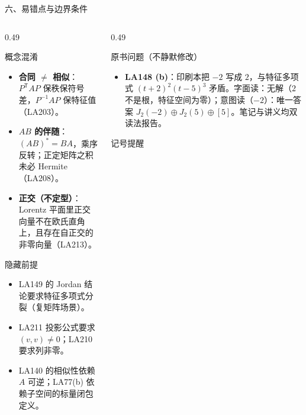 \documentclass[aspectratio=169,10pt,fontset=none]{ctexbeamer}
\begin{document}
\begin{frame}[t]{六、易错点与边界条件}
  \begin{columns}[T,onlytextwidth]
    \begin{column}{0.49\textwidth}
      \begin{alertblock}{\footnotesize 概念混淆}
        \scriptsize
        \begin{itemize}\setlength{\itemsep}{1pt}
          \item \textbf{合同 $\ne$ 相似}：$P^{\mathsf T}AP$ 保秩保符号差，$P^{-1}AP$ 保特征值（LA203）。
          \item \textbf{$AB$ 的伴随}：$(AB)^*=BA$，乘序反转；正定矩阵之积未必 Hermite（LA208）。
          \item \textbf{正交（不定型）}：Lorentz 平面里正交向量不在欧氏直角上，且存在自正交的非零向量（LA213）。
        \end{itemize}
      \end{alertblock}
      \begin{alertblock}{\footnotesize 隐藏前提}
        \scriptsize
        \begin{itemize}\setlength{\itemsep}{1pt}
          \item LA149 的 Jordan 结论要求特征多项式分裂（复矩阵场景）。
          \item LA211 投影公式要求 $(v,v)\ne0$；LA210 要求列非零。
          \item LA140 的相似性依赖 $A$ 可逆；LA77(b) 依赖子空间的标量闭包定义。
        \end{itemize}
      \end{alertblock}
    \end{column}
    \begin{column}{0.49\textwidth}
      \begin{alertblock}{\footnotesize 原书问题（不静默修改）}
        \scriptsize
        \begin{itemize}\setlength{\itemsep}{1pt}
          \item \textbf{LA148 (b)}：印刷本把 $-2$ 写成 $2$，与特征多项式 $(t+2)^2(t-5)^3$ 矛盾。字面读：无解（$2$ 不是根，特征空间为零）；意图读（$-2$）：唯一答案 $J_2(-2)\oplus J_2(5)\oplus[5]$。笔记与讲义均双读法报告。
        \end{itemize}
      \end{alertblock}
      \begin{block}{\footnotesize 记号提醒}
        \scriptsize

\end{block}
\end{column}
\end{columns}
\end{frame}
\end{document}
